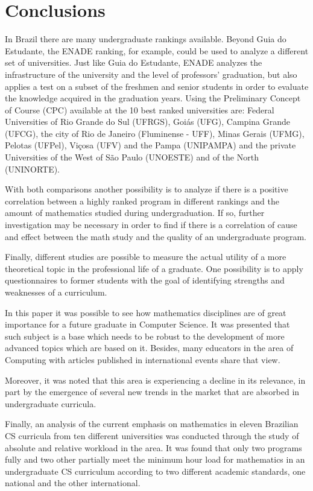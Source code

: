 \documentclass[conference]{IEEEtran}
\begin{document}
\section{Conclusions}
	In Brazil there are many undergraduate rankings available. Beyond Guia do Estudante, the ENADE ranking, for example, could be used to analyze a different set of universities. Just like Guia do Estudante, ENADE analyzes the infrastructure of the university and the level of professors' graduation, but also applies a test on a subset of the freshmen and senior students in order to evaluate the knowledge acquired in the graduation years. \cite{enade_info} Using the Preliminary Concept of Course (CPC) available at \cite{enade} the 10 best ranked universities are: Federal Universities of Rio Grande do Sul (UFRGS), Goiás (UFG), Campina Grande (UFCG), the city of Rio de Janeiro (Fluminense - UFF), Minas Gerais (UFMG), Pelotas (UFPel), Viçosa (UFV) and the Pampa (UNIPAMPA) and the private Universities of the West of São Paulo (UNOESTE) and of the North (UNINORTE). 
	
	With both comparisons another possibility is to analyze if there is a positive correlation between a highly ranked program in different rankings and the amount of mathematics studied during undergraduation. If so, further investigation may be necessary in order to find if there is a correlation of cause and effect between the math study and the quality of an undergraduate program.
	
	Finally, different studies are possible to measure the actual utility of a more theoretical topic in the professional life of a graduate. One possibility is to apply questionnaires to former students with the goal of identifying strengths and weaknesses of a curriculum.

	In this paper it was possible to see how mathematics disciplines are of great importance for a future graduate in Computer Science. It was presented that such subject is a base which needs to be robust to the development of more advanced topics which are based on it. Besides, many educators in the area of Computing with articles published in international events share that view.

	Moreover, it was noted that this area is experiencing a decline in its relevance, in part by the emergence of several new trends in the market that are absorbed in undergraduate curricula.
	
	Finally, an analysis of the current emphasis on mathematics in eleven Brazilian CS curricula from ten different universities was conducted through the study of absolute and relative workload in the area. It was found that only two programs fully and two other partially meet the minimum hour load for mathematics in an undergraduate CS curriculum according to two different academic standards, one national and the other international.
	
\end{document}
